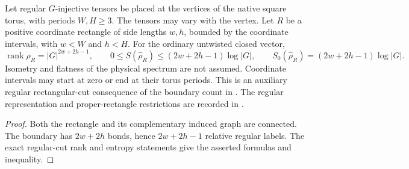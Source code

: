 \begin{lemma}%
    \label{thm:peps_regular_torus_rectangle_entropy_bound}
    \leanok
    Let regular $G$-injective tensors be placed at the vertices of the
    native square torus, with periods $W,H\geq3$. The tensors may vary
    with the vertex. Let $R$ be a positive coordinate rectangle of
    side lengths $w,h$, bounded by the coordinate intervals, with
    $w<W$ and $h<H$. For the ordinary untwisted closed vector,
    \[
        \operatorname{rank}\rho_R=|G|^{2w+2h-1},
        \qquad
        0\leq S(\widehat\rho_R)\leq(2w+2h-1)\log|G|,
        \qquad
        S_0(\widehat\rho_R)=(2w+2h-1)\log|G|.
    \]
    Isometry and flatness of the physical spectrum are not assumed.
    Coordinate intervals may start at zero or end at their torus
    periods. This is an auxiliary regular rectangular-cut consequence
    of the boundary count in
    \cite[Corollary~6.10]{Schuch2010PEPS}.
    The regular representation and proper-rectangle restrictions are recorded in
    \cite{gap:rmp_peps_quantum_double_g_isometry}.
\end{lemma}

\begin{proof}\leanok
    Both the rectangle and its complementary induced graph are
    connected. The boundary has $2w+2h$ bonds, hence $2w+2h-1$
    relative regular labels. The exact regular-cut rank and entropy
    statements give the asserted formulas and inequality.
\end{proof}

